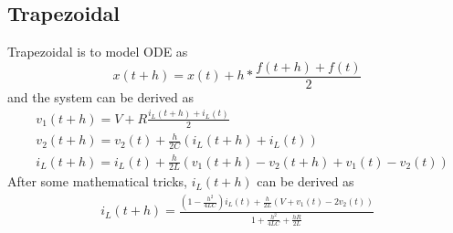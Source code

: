 \documentclass{article}
\begin{document}
\subsection{Trapezoidal}
Trapezoidal is to model ODE as 
$$
    x(t + h) = x(t) + h * \frac{f(t+h) + f(t)}{2}
$$
and the system can be derived as
\begin{align}
    & v_1(t+h) = V + R\frac{i_L(t+h) + i_L(t)}{2} \\
    & v_2(t+h) = v_2(t) + \frac{h}{2C}(i_L(t+h) + i_L(t)) \\
    & i_L(t+h) = i_L(t) + \frac{h}{2L}(v_1(t+h) - v_2(t+h) + v_1(t) - v_2(t))
\end{align}
After some mathematical tricks, $i_L(t+h)$ can be derived as
\begin{align}
    i_L(t+h) = \frac{(1-\frac{h^2}{4LC})i_L(t) + \frac{h}{2L}(V + v_1(t) - 2v_2(t))}{1 + \frac{h^2}{4LC} + \frac{hR}{2L}}
\end{align}
\end{document}
